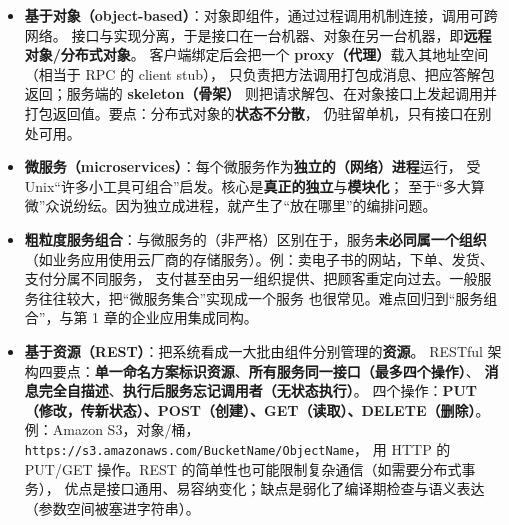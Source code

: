 \begin{itemize}
  \item \textbf{基于对象（object-based）}：对象即组件，通过过程调用机制连接，调用可跨网络。
        接口与实现分离，于是接口在一台机器、对象在另一台机器，即\textbf{远程对象/分布式对象}。
        客户端绑定后会把一个 \textbf{proxy（代理）}载入其地址空间（相当于 RPC 的 client stub），
        只负责把方法调用打包成消息、把应答解包返回；服务端的 \textbf{skeleton（骨架）}
        则把请求解包、在对象接口上发起调用并打包返回值。要点：分布式对象的\textbf{状态不分散}，
        仍驻留单机，只有接口在别处可用。
  \item \textbf{微服务（microservices）}：每个微服务作为\textbf{独立的（网络）进程}运行，
        受 Unix“许多小工具可组合”启发。核心是\textbf{真正的独立}与\textbf{模块化}；
        至于“多大算微”众说纷纭。因为独立成进程，就产生了“放在哪里”的编排问题。
  \item \textbf{粗粒度服务组合}：与微服务的（非严格）区别在于，服务\textbf{未必同属一个组织}
        （如业务应用使用云厂商的存储服务）。例：卖电子书的网站，下单、发货、支付分属不同服务，
        支付甚至由另一组织提供、把顾客重定向过去。一般服务往往较大，把“微服务集合”实现成一个服务
        也很常见。难点回归到“服务组合”，与第 1 章的企业应用集成同构。
  \item \textbf{基于资源（REST）}：把系统看成一大批由组件分别管理的\textbf{资源}。
        RESTful 架构四要点：\textbf{单一命名方案标识资源}、\textbf{所有服务同一接口（最多四个操作）}、
        \textbf{消息完全自描述}、\textbf{执行后服务忘记调用者（无状态执行）}。
        四个操作：\textbf{PUT（修改，传新状态）、POST（创建）、GET（读取）、DELETE（删除）}。
        例：Amazon S3，对象/桶，\texttt{https://s3.amazonaws.com/BucketName/ObjectName}，
        用 HTTP 的 PUT/GET 操作。REST 的简单性也可能限制复杂通信（如需要分布式事务），
        优点是接口通用、易容纳变化；缺点是弱化了编译期检查与语义表达（参数空间被塞进字符串）。
\end{itemize}

\begin{closeread}
\end{closeread}


